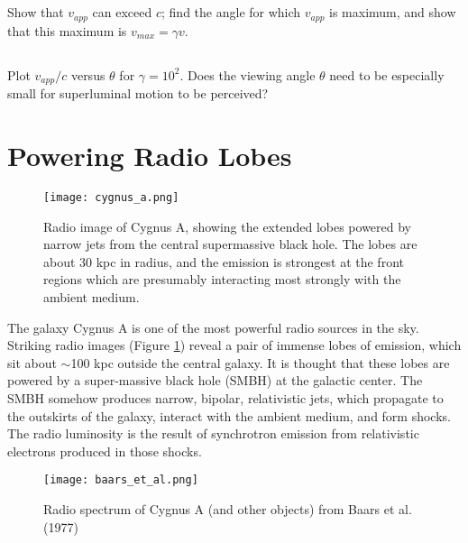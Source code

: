 \documentclass[11pt]{article}
\begin{document}
\subsection{}
Show that $v_{app}$ can exceed $c$; find the angle for which $v_{app}$ is maximum,
and show that this maximum is $v_{max}=\gamma v$.

\subsection{}
Plot $v_{app}/c$ versus $\theta$ for $\gamma=10^2$.  Does the viewing angle $\theta$
need to be especially small for superluminal motion to be perceived?

\section{Powering Radio Lobes}

\begin{figure}[!ht]\centering
\texttt{[image: cygnus\_a.png]}
\caption{
Radio image of Cygnus A, showing the extended lobes powered by narrow jets from
the central supermassive black hole. The lobes are about 30 kpc in radius,
and the emission is strongest at the front regions which are presumably
interacting most strongly with the ambient medium.
}\label{fig:cygnus_a}
\end{figure}

The galaxy Cygnus A is one of the most powerful radio sources in the sky.
Striking radio images (Figure \ref{fig:cygnus_a}) reveal a pair of immense lobes of emission,
which sit about $\sim$100 kpc outside the central galaxy. It is thought that these
lobes are powered by a super-massive black hole (SMBH) at the galactic center.
The SMBH somehow produces narrow, bipolar, relativistic jets, which propagate
to the outskirts of the galaxy, interact with the ambient medium, and form
shocks. The radio luminosity is the result of synchrotron emission from
relativistic electrons produced in those shocks.

\begin{figure}[!ht]\centering
\texttt{[image: baars\_et\_al.png]}
\caption{
Radio spectrum of Cygnus A (and other objects) from Baars et al. (1977)
}\label{fig:baars_et_al}
\end{figure}
\end{document}
